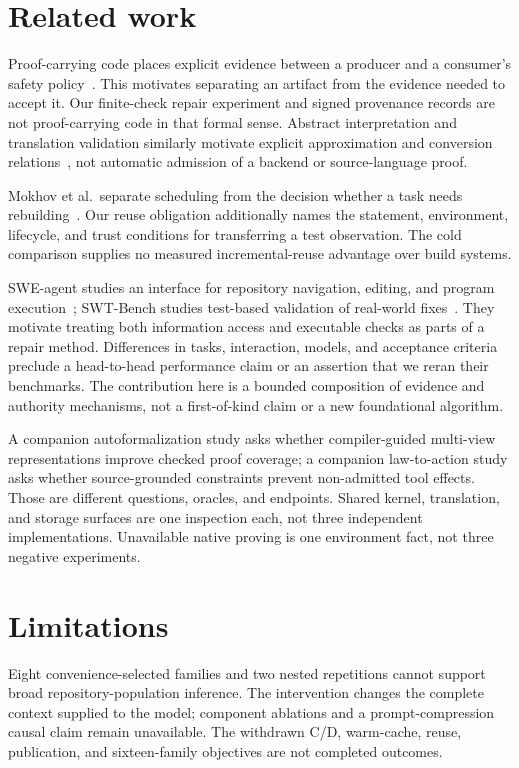 \documentclass{article}
\begin{document}
\section{Related work}
\label{sec:related-work}

Proof-carrying code places explicit evidence between a producer and a
consumer's safety policy~\citep{baseline01}. This motivates separating an
artifact from the evidence needed to accept it. Our finite-check repair
experiment and signed provenance records are not proof-carrying code in
that formal sense. Abstract interpretation and translation validation
similarly motivate explicit approximation and conversion
relations~\citep{baseline02,baseline04}, not automatic admission of a backend
or source-language proof.

Mokhov et al.\ separate scheduling from the decision whether a task needs
rebuilding~\citep{baseline07}. Our reuse obligation additionally names the
statement, environment, lifecycle, and trust conditions for transferring a
test observation. The cold comparison supplies no measured incremental-reuse
advantage over build systems.

SWE-agent studies an interface for repository navigation, editing, and program
execution~\citep{baseline08}; SWT-Bench studies test-based validation of
real-world fixes~\citep{baseline11}. They motivate treating both information
access and executable checks as parts of a repair method. Differences in tasks,
interaction, models, and acceptance criteria preclude a head-to-head performance
claim or an assertion that we reran their benchmarks. The contribution here is
a bounded composition of evidence and authority mechanisms, not a first-of-kind
claim or a new foundational algorithm.

A companion autoformalization study asks whether compiler-guided multi-view
representations improve checked proof coverage; a companion law-to-action
study asks whether source-grounded constraints prevent non-admitted tool
effects. Those are different questions, oracles, and endpoints. Shared kernel,
translation, and storage surfaces are one inspection each, not three
independent implementations. Unavailable native proving is one environment
fact, not three negative experiments.

\section{Limitations}
\label{sec:limitations}

Eight convenience-selected families and two nested repetitions cannot support
broad repository-population inference. The intervention changes the complete
context supplied to the model; component ablations and a prompt-compression
causal claim remain unavailable. The withdrawn C/D, warm-cache, reuse,
publication, and sixteen-family objectives are not completed outcomes.
\end{document}
